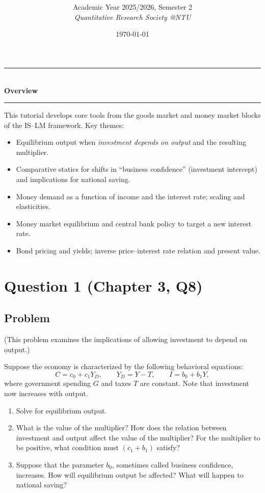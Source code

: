 \documentclass[12pt]{article}
\title{
\CourseCode \CourseName \\[0.3em]
\large \DocType
}
\author{
  Academic Year 2025/2026, Semester 2 \\[0.25em]
  \textit{Quantitative Research Society @NTU}
}
\date{\today}
\begin{document}
\maketitle
\thispagestyle{plainfirst}
\pagestyle{main}
\bigskip

\begin{center}
  \rule{0.8\textwidth}{0.4pt}\\[4pt]
  \textbf{Overview}\\[2pt]
  \rule{0.8\textwidth}{0.4pt}
\end{center}

\noindent
This tutorial develops core tools from the goods market and money market blocks of the IS--LM framework. Key themes:
\begin{itemize}[leftmargin=*]
  \item Equilibrium output when \emph{investment depends on output} and the resulting multiplier.
  \item Comparative statics for shifts in ``business confidence'' (investment intercept) and implications for national saving.
  \item Money demand as a function of income and the interest rate; scaling and elasticities.
  \item Money market equilibrium and central bank policy to target a new interest rate.
  \item Bond pricing and yields; inverse price--interest rate relation and present value.
\end{itemize}

\newpage

\section*{Question 1 (Chapter 3, Q8)}
\subsection*{Problem}
(This problem examines the implications of allowing investment to depend on output.)

Suppose the economy is characterized by the following behavioral equations:
\[
C = c_0 + c_1Y_D,\qquad
Y_D = Y - T,\qquad
I = b_0 + b_1Y,
\]
where government spending \(G\) and taxes \(T\) are constant. Note that investment now increases with output.
\begin{enumerate}[label=(\alph*)]
  \item Solve for equilibrium output.
  \item What is the value of the multiplier? How does the relation between investment and output affect the value of the multiplier? For the multiplier to be positive, what condition must \((c_1+b_1)\) satisfy?
  \item Suppose that the parameter \(b_0\), sometimes called business confidence, increases. How will equilibrium output be affected? What will happen to national saving?
\end{enumerate}
\end{document}
